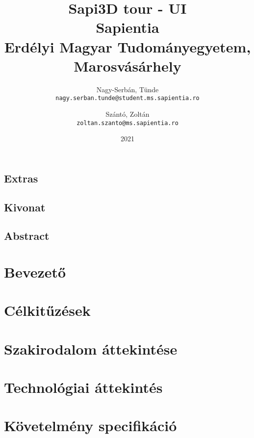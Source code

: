 \documentclass[12pt, twosides]{report}
\title{
	{Sapi3D tour - UI}\\
	{\large Sapientia\\
	Erdélyi Magyar Tudományegyetem, Marosvásárhely}
}
\author{
	Nagy-Serbán, Tünde\\
	\texttt{nagy.serban.tunde@student.ms.sapientia.ro}
	\and
	Szántó, Zoltán\\
	\texttt{zoltan.szanto@ms.sapientia.ro}	
}
\date{2021}
\begin{document}


\section*{Extras}

\pagebreak



\section*{Kivonat}

\pagebreak

\section*{Abstract}

\pagebreak


\tableofcontents

\listoffigures

\chapter{Bevezető}


\chapter{Célkitűzések}


\chapter{Szakirodalom áttekintése}


\chapter{Technológiai áttekintés}



\chapter{Követelmény specifikáció}



\end{document}
